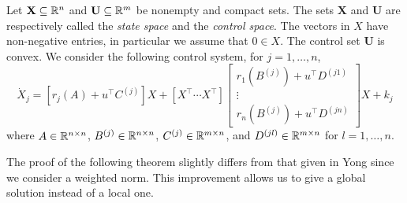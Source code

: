 Let $\mathbf{X}\subseteq\mathbb{R}^n$ and $\mathbf{U}\subseteq \mathbb{R}^m$ be nonempty and compact sets. The sets $\mathbf{X}$ and $\mathbf{U}$ are 
respectively called the {\it state space} and the {\it control space}. The vectors in $X$ have non-negative entries, in particular we assume that $0\in X$. The control set $\mathbf{U}$ is convex. We consider the following control system, for $j=1,\ldots,n$, 
\begin{equation}\label{FamilyControlSystem}
    \dot{X}_j  =  [r_j(A) + u^\top C^{(j)}]X +
    [X^\top \cdots X^\top]     \begin{bmatrix}
    r_1(B^{(j)}) + u^\top D^{(j1)}\\
    \vdots \\
    r_n(B^{(j)}) + u^\top D^{(jn)}
  \end{bmatrix}  X + k_j
\end{equation}
where $A\in\mathbb{R}^{n\times n}$, $B^{(j)}\in\mathbb{R}^{n\times n}$, $C^{(j)}\in\mathbb{R}^{m\times n}$, and $ D^{(jl)}\in\mathbb{R}^{m\times n}$ for $l=1,\ldots,n$.






The proof of the following theorem slightly differs from that given in Yong \cite[Sect. 2.1]{Yong2015} since we consider a weighted norm. This improvement allows us to give a global solution instead of a local one. 

